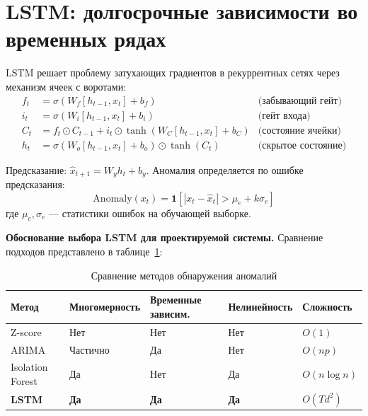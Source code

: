 \section{LSTM: долгосрочные зависимости во временных рядах}

LSTM \cite{goodfellow_deep_learning,lstm_time_series} решает проблему затухающих градиентов в рекуррентных сетях через механизм ячеек с воротами:
\begin{align}
f_t &= \sigma(W_f [h_{t-1}, x_t] + b_f) & \text{(забывающий гейт)} \label{eq:lstm_forget} \\
i_t &= \sigma(W_i [h_{t-1}, x_t] + b_i) & \text{(гейт входа)} \label{eq:lstm_input} \\
C_t &= f_t \odot C_{t-1} + i_t \odot \tanh(W_C [h_{t-1}, x_t] + b_C) & \text{(состояние ячейки)} \label{eq:lstm_cell_state} \\
h_t &= \sigma(W_o [h_{t-1}, x_t] + b_o) \odot \tanh(C_t) & \text{(скрытое состояние)} \label{eq:lstm_hidden}
\end{align}

Предсказание: $\hat{x}_{t+1} = W_y h_t + b_y$. Аномалия определяется по ошибке предсказания:
\begin{equation}
\text{Anomaly}(x_t) = \mathbf{1}[|x_t - \hat{x}_t| > \mu_e + k\sigma_e]
\label{eq:lstm_anomaly}
\end{equation}
где $\mu_e, \sigma_e$ --- статистики ошибок на обучающей выборке.

\textbf{Обоснование выбора LSTM для проектируемой системы.} Сравнение подходов представлено в таблице~\ref{tab:anomaly_methods_comparison}:

\begin{table}[H]
\centering
\small
\caption{Сравнение методов обнаружения аномалий}
\label{tab:anomaly_methods_comparison}
\setlength{\tabcolsep}{3pt}
\begin{tabular}{|p{2.8cm}|p{2.5cm}|p{3cm}|p{2.5cm}|p{2.5cm}|}
\hline
\textbf{Метод} & \textbf{Многомер\-ность} & \textbf{Временные зависим.} & \textbf{Нелиней\-ность} & \textbf{Сложность} \\
\hline
Z-score & Нет & Нет & Нет & $O(1)$ \\
\hline
ARIMA & Частично & Да & Нет & $O(np)$ \\
\hline
Isolation Forest & Да & Нет & Да & $O(n \log n)$ \\
\hline
\textbf{LSTM} & \textbf{Да} & \textbf{Да} & \textbf{Да} & $O(Td^2)$ \\
\hline
\end{tabular}
\end{table}

